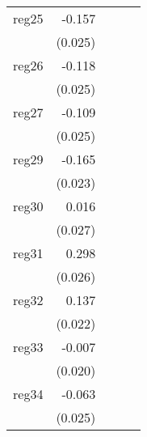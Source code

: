 {\begin{longtable}{l*{4}{D{.}{.}{-1}}}
\addlinespace
reg25       &      -0.157\sym{***}&                     &                     &                     \\
            &     (0.025)         &                     &                     &                     \\
\addlinespace
reg26       &      -0.118\sym{***}&                     &                     &                     \\
            &     (0.025)         &                     &                     &                     \\
\addlinespace
reg27       &      -0.109\sym{***}&                     &                     &                     \\
            &     (0.025)         &                     &                     &                     \\
\addlinespace
reg29       &      -0.165\sym{***}&                     &                     &                     \\
            &     (0.023)         &                     &                     &                     \\
\addlinespace
reg30       &       0.016         &                     &                     &                     \\
            &     (0.027)         &                     &                     &                     \\
\addlinespace
reg31       &       0.298\sym{***}&                     &                     &                     \\
            &     (0.026)         &                     &                     &                     \\
\addlinespace
reg32       &       0.137\sym{***}&                     &                     &                     \\
            &     (0.022)         &                     &                     &                     \\
\addlinespace
reg33       &      -0.007         &                     &                     &                     \\
            &     (0.020)         &                     &                     &                     \\
\addlinespace
reg34       &      -0.063\sym{*}  &                     &                     &                     \\
            &     (0.025)         &                     &                     &                     \\

\end{longtable}}
